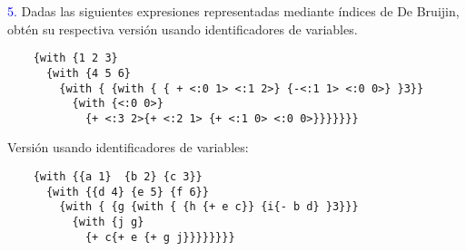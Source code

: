 \newpage
{\textcolor{blue}{5.}} Dadas las siguientes expresiones representadas mediante
índices de De Bruijin, obtén su respectiva versión usando identificadores de
variables.
\begin{lstlisting}
    {with {1 2 3}
      {with {4 5 6}
        {with { {with { { + <:0 1> <:1 2>} {-<:1 1> <:0 0>} }3}}
          {with {<:0 0>}
            {+ <:3 2>{+ <:2 1> {+ <:1 0> <:0 0>}}}}}}}
\end{lstlisting}

Versión usando identificadores de variables:

\begin{lstlisting}
    {with {{a 1}  {b 2} {c 3}}
      {with {{d 4} {e 5} {f 6}}
        {with { {g {with { {h {+ e c}} {i{- b d} }3}}}
          {with {j g}
            {+ c{+ e {+ g j}}}}}}}}
\end{lstlisting}
